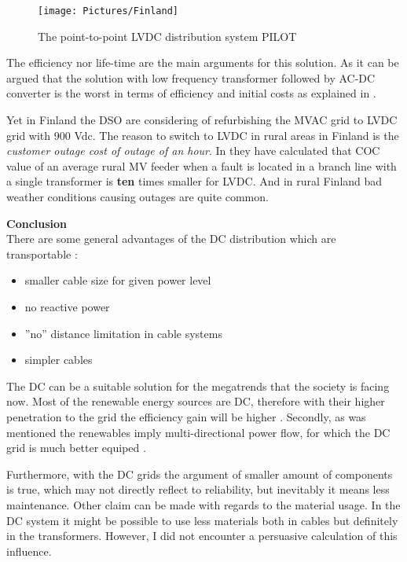 \documentclass[]{scrartcl}
\begin{document}
\begin{figure}[h!]
	\centering
	\texttt{[image: Pictures/Finland]}
	\caption{The point-to-point LVDC distribution system PILOT}
	\label{fig:Finland}
\end{figure}

The efficiency nor life-time are the main arguments for this solution. As it can be argued that the solution with low frequency transformer followed by AC-DC converter is the worst in terms of efficiency and initial costs as explained in \cite{Kolar2014d}.

Yet in Finland the DSO are considering of refurbishing the MVAC grid to LVDC grid with 900 Vdc. The reason to switch to LVDC in rural areas in Finland is the \emph{customer outage cost of outage of an hour}. In \cite{Hakala2015} they have calculated that COC value of an average rural MV feeder when a fault is located in a branch line with a single transformer is \textbf{ten} times smaller for LVDC. And in rural Finland bad weather conditions causing outages are  quite common. 


\textbf{Conclusion} \\
There are some general advantages of the DC distribution which are transportable\cite{Jovcic2014} :
\begin{itemize}
	\item smaller cable size for given power level
	\item no reactive power 
	\item ''no'' distance limitation in cable systems
	\item simpler cables
\end{itemize}


The DC can be a suitable solution for the megatrends that the society is facing now. Most of the renewable energy sources are DC, therefore with their higher penetration to the grid the efficiency gain will be higher \cite{Evans2013}. Secondly, as was mentioned the renewables imply multi-directional power flow, for which the DC grid is much better equiped \cite{Doncker2014}. 

Furthermore, with the DC grids the argument of smaller amount of components is true, which may not directly reflect to reliability, but inevitably it means less maintenance. Other claim can be made with regards to the material usage. In the DC system it might be possible to use less materials both in cables but definitely in the transformers. However, I did not encounter a persuasive calculation of this influence.
\end{document}
